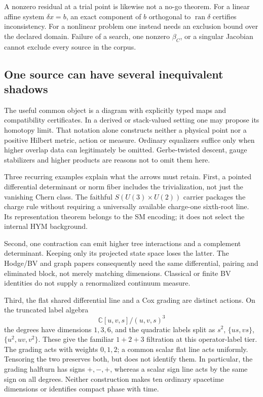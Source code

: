 \documentclass[11pt,a4paper]{article}
\begin{document}
A nonzero residual at a trial point is likewise not a no-go theorem.
For a linear affine system \(\delta x=b\), an exact component of \(b\)
orthogonal to \(\operatorname{ran}\delta\) certifies inconsistency. For
a nonlinear problem one instead needs an exclusion bound over the
declared domain. Failure of a search, one nonzero \(\beta_C\), or a
singular Jacobian cannot exclude every source in the corpus.

\subsection{One source can have several inequivalent shadows}
\label{sec:atlas-arrows}

The useful common object is a diagram with explicitly typed maps and
compatibility certificates. In a derived or stack-valued setting one
may propose its homotopy limit. That notation alone constructs neither
a physical point nor a positive Hilbert metric, action or measure.
Ordinary equalizers suffice only when higher overlap data can
legitimately be omitted. Gerbe-twisted descent, gauge stabilizers and
higher products are reasons not to omit them here.

Three recurring examples explain what the arrows must retain.
First, a pointed differential determinant or norm fiber includes the
trivialization, not just the vanishing Chern class. The faithful
\(S(U(3)\times U(2))\) carrier packages the charge rule without requiring
a universally available charge-one sixth-root line. Its representation
theorem belongs to the SM encoding; it does not select the internal
HYM background.

Second, one contraction can emit higher tree interactions and a
complement determinant. Keeping only its projected state space loses
the latter. The Hodge/BV and graph papers consequently need the same
differential, pairing and eliminated block, not merely matching
dimensions. Classical or finite BV identities do not supply a
renormalized continuum measure.

Third, the flat shared differential line and a Cox grading are distinct
actions. On the truncated label algebra
\[
 \mathbb C[u,v,s]/(u,v,s)^3
\]
the degrees have dimensions \(1,3,6\), and the quadratic labels split
as \(s^2\), \(\{us,vs\}\), \(\{u^2,uv,v^2\}\). These give the familiar
\(1+2+3\) filtration at this operator-label tier. The grading acts with
weights \(0,1,2\); a common scalar flat line acts uniformly. Tensoring
the two preserves both, but does not identify them. In particular,
the grading halfturn has signs \(+,-,+\), whereas a scalar sign line
acts by the same sign on all degrees. Neither construction makes ten
ordinary spacetime dimensions or identifies compact phase with time.
\end{document}
